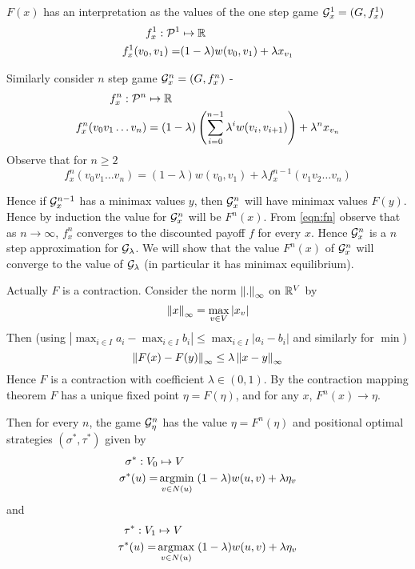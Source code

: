 $F(x)$ has an interpretation as the values of the one step game $\G_x^1=(G,f^1_x)$
\begin{align}
    f^1_x : \PF[1] &\mapsto \Reals\\
    f^1_x (v_0,v_1) = & (1-\lambda) w(v_0,v_1) + \lambda x_{v_1} 
\end{align}

Similarly consider $n$ step game $\G_x^n=(G,f^n_x)$ -
\begin{align}
    f^n_x : \PF[n] &\mapsto \Reals\\
    f^n_x(v_0v_1 \ldots v_n) &= (1-\lambda)\left(\sum_{i=0}^{n-1} \lambda^i w(v_i,v_{i+1})\right) + \lambda^n x_{v_n} \label{eqn:fn}
\end{align}
Observe that for $n\geq 2$
\[
    f^n_x(v_0v_1 \ldots v_n) = (1-\lambda)w(v_0,v_1) + \lambda f^{n-1}_x(v_1v_2 \ldots v_n) 
\]

Hence if $\G_x^{n-1}$ has a minimax values $y$, then $\G_x^n$ will have minimax values $F(y)$. Hence by induction the value for $\G_x^n$ will be $F^n(x)$. From \eqref{eqn:fn} observe that as $n \to \infty$, $f^n_x$ converges to the discounted payoff $f$ for every $x$. Hence $\G_x^n$ is a $n$ step approximation for $\G_\lambda$. We will show that the value $F^n(x)$ of $\G_x^n$ will converge to the value of $\G_\lambda$ (in particular it has minimax equilibrium).

Actually $F$ is a contraction. Consider the norm $\normi{.}$ on $\Reals^V$ by
\begin{equation}
    \normi{x} = \max_{v \in V} |x_v|
\end{equation}
Then (using $|\max_{i\in I} a_i - \max_{i \in I} b_i| \leq \max_{i \in I} |a_i-b_i|$ and similarly for $\min$)
\[
    \normi{F(x)-F(y)} \leq \lambda \normi{x-y}
\]
Hence $F$ is a contraction with coefficient $\lambda \in (0,1)$. By the contraction mapping theorem $F$ has a unique fixed point $\eta = F(\eta)$, and for any $x$, $F^n(x) \to \eta$.

Then for every $n$, the game $\G_\eta^n$ has the value $\eta=F^n(\eta)$ and positional optimal strategies $(\sigma^*,\tau^*)$ given by
\begin{align}
    \sigma^* : V_0 &\mapsto V\\
    \sigma^*(u) = &\argmin_{ v \in N(u)} \; (1-\lambda) w(u,v) + \lambda \eta_v
\end{align}
and
\begin{align}
    \tau^* : V_1 &\mapsto V\\
    \tau^*(u) =& \argmax_{ v \in N(u)} \; (1-\lambda) w(u,v) + \lambda \eta_v
\end{align}

